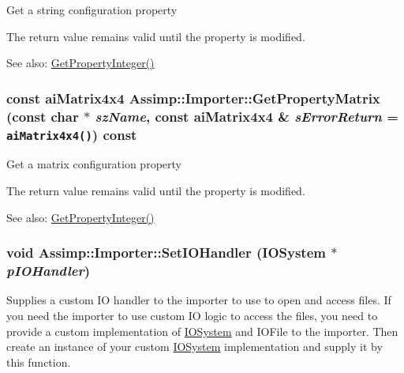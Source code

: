 Get a string configuration property

The return value remains valid until the property is modified. \begin{Desc}
\item[See also:]\hyperlink{class_assimp_1_1_importer_3e796a0758a9f10f13107f44c542ad41}{GetPropertyInteger()} \end{Desc}
\hypertarget{class_assimp_1_1_importer_1b2e36eab7155233846b24ec30e7e273}{
\subsubsection[GetPropertyMatrix]{\setlength{\rightskip}{0pt plus 5cm}const aiMatrix4x4 Assimp::Importer::GetPropertyMatrix (const char $\ast$ {\em szName}, \/  const aiMatrix4x4 \& {\em sErrorReturn} = {\tt aiMatrix4x4()}) const}}
\label{class_assimp_1_1_importer_1b2e36eab7155233846b24ec30e7e273}


Get a matrix configuration property

The return value remains valid until the property is modified. \begin{Desc}
\item[See also:]\hyperlink{class_assimp_1_1_importer_3e796a0758a9f10f13107f44c542ad41}{GetPropertyInteger()} \end{Desc}
\hypertarget{class_assimp_1_1_importer_1161f46318af18bb86dfe0fc3edea4df}{
\subsubsection[SetIOHandler]{\setlength{\rightskip}{0pt plus 5cm}void Assimp::Importer::SetIOHandler ({\bf IOSystem} $\ast$ {\em pIOHandler})}}
\label{class_assimp_1_1_importer_1161f46318af18bb86dfe0fc3edea4df}


Supplies a custom IO handler to the importer to use to open and access files. If you need the importer to use custom IO logic to access the files, you need to provide a custom implementation of \hyperlink{class_assimp_1_1_i_o_system}{IOSystem} and IOFile to the importer. Then create an instance of your custom \hyperlink{class_assimp_1_1_i_o_system}{IOSystem} implementation and supply it by this function.

